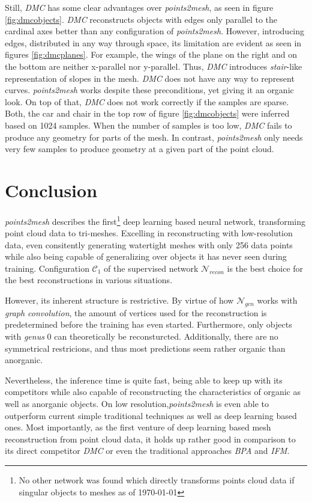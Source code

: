   Still, \emph{DMC} has some clear advantages over \emph{points2mesh}, as seen in figure \ref{fig:dmcobjects}. \emph{DMC} reconstructs objects with edges only 
  parallel to the cardinal axes better than any configuration of \emph{points2mesh}. However, introducing edges, distributed in any way through space,
  its limitation are evident as seen in figures \ref{fig:dmcplanes}. For example, the wings of the plane on the right and on the bottom are neither x-parallel nor y-parallel.
  Thus, \emph{DMC} introduces \emph{stair}-like representation of slopes in the mesh. \emph{DMC} does not have any way to represent curves. \emph{points2mesh}
  works despite these preconditions, yet giving it an organic look.
  On top of that, \emph{DMC} does not work correctly if the samples are sparse. Both, the car and chair in the top row of figure \ref{fig:dmcobjects} were inferred based on 1024 samples.
  When the number of samples is too low, \emph{DMC} fails to produce any geometry for parts of the mesh.
  In contrast, \emph{points2mesh} only needs very few samples to produce geometry at a given part of the point cloud.

\section{Conclusion}
\label{conclusion}
  \emph{points2mesh} describes the first\footnote{No other network was found which directly transforms points cloud data if singular objects to meshes as of \today} deep
  learning based neural network, transforming point cloud data to tri-meshes. Excelling in reconstructing with low-resolution data,
  even consitently generating watertight meshes with only 256 data points while also being capable of generalizing over objects it has never seen 
  during training. Configuration $\mathcal{C}_1$ of the supervised network $\mathcal{N}_{recon}$ is the best choice for the best reconstructions
  in various situations.

  However, its inherent structure is restrictive. By virtue of how $\mathcal{N}_{gcn}$ works with \emph{graph convolution}, the amount
  of vertices used for the reconstruction is predetermined before the training has even started. Furthermore, only objects with \emph{genus} 0 
  can theoretically be reconsturcted. Additionally, there are no symmetrical restricions, and thus most predictions seem rather organic than anorganic.

  Nevertheless, the inference time is quite fast, being able to keep up with its competitors while also capable of reconstructing
  the characteristics of organic as well as anorganic objects. On low resolution,\emph{points2mesh} is even able to outperform current
  simple traditional techniques as well as deep learning based ones. Most importantly, as the first venture of deep learning based mesh reconstruction 
  from point cloud data, it holds up rather good in comparison to its direct competitor \emph{DMC} or even the traditional approaches \emph{BPA} and \emph{IFM}.



